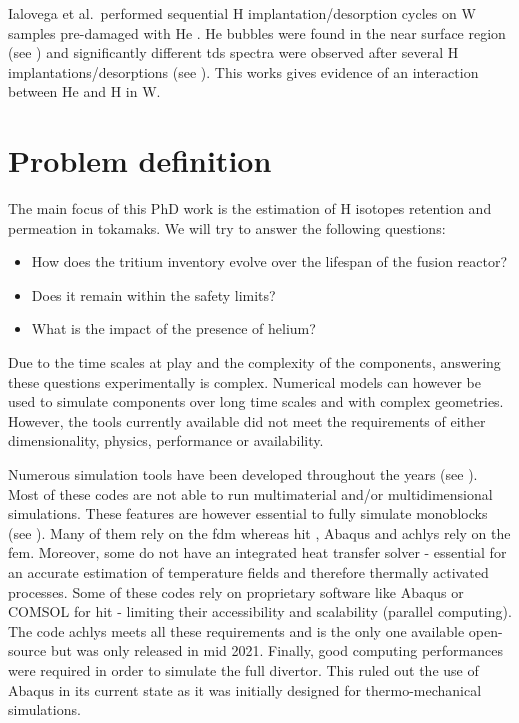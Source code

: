 Ialovega et al.\ performed sequential \gls{H} implantation/desorption cycles on \gls{W} samples pre-damaged with \gls{He} .
He bubbles were found in the near surface region (see ) and significantly different \gls{tds} spectra were observed after several \gls{H} implantations/desorptions (see ).
This works gives evidence of an interaction between \gls{He} and \gls{H} in \gls{W}.

\section{Problem definition}

The main focus of this PhD work is the estimation of H \glspl{isotope} \gls{retention} and permeation in \glspl{tokamak}.
We will try to answer the following questions:
\begin{itemize}
    \item How does the tritium \gls{inventory} evolve over the lifespan of the fusion reactor?
    \item Does it remain within the safety limits?
    \item What is the impact of the presence of helium?
\end{itemize}

Due to the time scales at play and the complexity of the components, answering these questions experimentally is complex.
Numerical models can however be used to simulate components over long time scales and with complex geometries.
However, the tools currently available did not meet the requirements of either dimensionality, physics, performance or availability.

Numerous simulation tools have been developed throughout the years (see ).
Most of these codes are not able to run multimaterial and/or multidimensional simulations.
These features are however essential to fully simulate monoblocks (see ).
Many of them rely on the \gls{fdm} whereas \acrshort{hit} , Abaqus  and \gls{achlys}  rely on the \gls{fem}.
Moreover, some do not have an integrated heat transfer solver - essential for an accurate estimation of temperature fields and therefore thermally activated processes.
Some of these codes rely on proprietary software like Abaqus or COMSOL for \acrshort{hit} - limiting their accessibility and scalability (parallel computing).
The code \gls{achlys} meets all these requirements and is the only one available open-source but was only released in mid 2021.
Finally, good computing performances were required in order to simulate the full \gls{divertor}.
This ruled out the use of Abaqus in its current state as it was initially designed for thermo-mechanical simulations.

